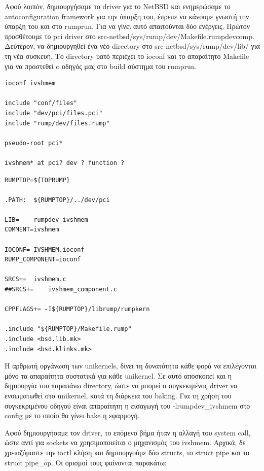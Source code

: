 Αφού λοιπόν, δημιουργήσαμε το driver για το NetBSD και ενημερώσαμε το
autoconfiguration framework για την ύπαρξη του, έπρεπε να κάνουμε γνωστή την
ύπαρξη του και στο rumprun. Για να γίνει αυτό απαιτούνται δύο ενέργεις. Πρώτον
προσθέτουμε το pci driver στο src-netbsd/sys/rump/dev/Makefile.rumpdevcomp.
Δεύτερον, να δημιουργηθεί ένα νέο directory στο src-netbsd/sys/rump/dev/lib/ για
τη νέα συσκευή. Το directory υατό περιέχει το ioconf και το απαραίτητο Makefile
για να προστεθεί o οδηγός μας στο build σύστημα του rumprun. 

\begin{lstlisting}[caption={IVSHMEM.ioconf},captionpos=b]
ioconf ivshmem

include "conf/files"
include "dev/pci/files.pci"
include "rump/dev/files.rump"

pseudo-root pci*

ivshmem* at pci? dev ? function ?
\end{lstlisting}

\begin{lstlisting}[caption={rumprun Makefile για το ivshmem},captionpos=b]
RUMPTOP=${TOPRUMP}

.PATH:	${RUMPTOP}/../dev/pci

LIB=	rumpdev_ivshmem
COMMENT=ivshmem

IOCONF=	IVSHMEM.ioconf
RUMP_COMPONENT=ioconf

SRCS+=	ivshmem.c
##SRCS+=	ivshmem_component.c

CPPFLAGS+= -I${RUMPTOP}/librump/rumpkern

.include "${RUMPTOP}/Makefile.rump"
.include <bsd.lib.mk>
.include <bsd.klinks.mk>
\end{lstlisting}

Η αρθρωτή οργάνωση των unikernels, δίνει τη δυνατότητα κάθε φορά να επιλέγονται
μόνο τα απαραίτητα συστατικά για κάθε unikernel. Σε αυτό αποσκοπεί και η
δημιουργία του παραπάνω directory, ώστε να μπορεί ο συγκεκιμένος driver να
ενσωματωθεί στο unikernel, κατά τη διάρκεια του baking. Για τη χρήση του
συγκεκριμένου οδηγού είναι απαραίτητη η εισαγωγή του -lrumpdev\_ivshmem στο
config με το οποίο θα γίνει bake η εφαρμογή. 

Αφού δημιουργήσαμε τον driver, το επόμενο βήμα ήταν η αλλαγή του system call,
ώστε αντί για sockets να χρησιμοποιείται ο μηχανισμός του ivshmem. Αρχικά, δε
χρειαζόμαστε την ioctl κλήση και δημιουργούμε δύο structs, το struct pipe και το
struct pipe\_op. Οι ορισμοί τους φαίνονται παρακάτω:

